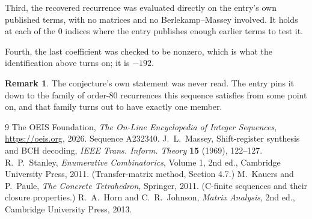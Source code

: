 \documentclass[11pt,a4paper]{article}
\theoremstyle{plain}
\theoremstyle{definition}
\newtheorem{remark}[theorem]{Remark}
\begin{document}
Third, the recovered recurrence was evaluated directly on the entry's own published terms, with
no matrices and no Berlekamp--Massey involved. It holds at each of the $0$ indices where
the entry publishes enough earlier terms to test it.

Fourth, the last coefficient was checked to be nonzero, which is what the identification above
turns on; it is $-192$.

\begin{remark}
The conjecture's own statement was never read. The entry pins it down to the family of
order-$80$ recurrences this sequence satisfies from some point on, and that family turns
out to have exactly one member.
\end{remark}

\begin{thebibliography}{9}
 The OEIS Foundation, \emph{The On-Line Encyclopedia of Integer
Sequences}, \url{https://oeis.org}, 2026. Sequence A232340.
 J.~L.~Massey, Shift-register synthesis and BCH decoding, \emph{IEEE
Trans. Inform. Theory} \textbf{15} (1969), 122--127.
 R.~P.~Stanley, \emph{Enumerative Combinatorics}, Volume 1, 2nd ed.,
Cambridge University Press, 2011. (Transfer-matrix method, Section 4.7.)
 M.~Kauers and P.~Paule, \emph{The Concrete Tetrahedron}, Springer, 2011.
(C-finite sequences and their closure properties.)
 R.~A.~Horn and C.~R.~Johnson, \emph{Matrix Analysis}, 2nd ed., Cambridge
University Press, 2013.
\end{thebibliography}
\end{document}
